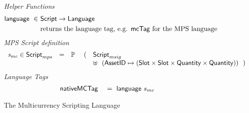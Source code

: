 \begin{figure*}[t!]
    \emph{Helper Functions}
  \begin{align*}
    \mathsf{language} ~\in~& \mathsf{Script} \to \mathsf{Language} \\
    &\text{returns the language tag, e.g. $\mathsf{mcTag}$ for the MPS language}
  \end{align*}
  \emph{MPS Script definition}
  \begin{equation*}
    \begin{array}{rllll}
      \mathit{s_{mc}}\in\mathsf{Script}_{mps} & = & \mathbb{P}~ & ( & \mathsf{Script}_{msig}\\
      &  & & & \uplus ~~
         (\mathsf{AssetID} \mapsto (\mathsf{Slot}\times\mathsf{Slot}\times\mathsf{Quantity}\times\mathsf{Quantity}))~~) \\
    \end{array}
  \end{equation*}
  \emph{Language Tags}
  \begin{align*}
    & \mathsf{nativeMCTag} & ~=~ \mathsf{language}~s_{mc}
    \end{align*}
  \caption{The Multicurrency Scripting Language}
  \label{fig:defs:tx-mc-script}

\end{figure*}
